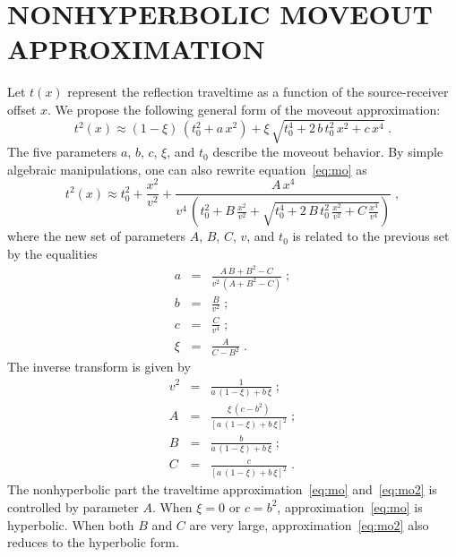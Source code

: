 \section{NONHYPERBOLIC MOVEOUT APPROXIMATION}

Let $t(x)$ represent the reflection traveltime as a function of the
source-receiver offset $x$. We propose the following general form of
the moveout approximation:
\begin{equation}
\label{eq:mo}
t^2(x) \approx (1-\xi)\,(t_0^2+a\,x^2) + \xi\,\sqrt{t_0^4 + 2\,b\,t_0^2\,x^2 + c\,x^4}\;.
\end{equation}
The five parameters $a$, $b$, $c$, $\xi$, and $t_0$
describe the moveout behavior. By simple algebraic manipulations, one
can also rewrite equation~\ref{eq:mo} as
\begin{equation}
\label{eq:mo2}
t^2(x) \approx t_0^2+\frac{x^2}{v^2} + \frac{A\,x^4}
{\displaystyle v^4\,\left(t_0^2+B\,\frac{x^2}{v^2} + \sqrt{t_0^4 + 2\,B\,t_0^2\,\frac{x^2}{v^2} + C\,\frac{x^4}{v^4}}\right)}\;,
\end{equation}
where the new set of parameters $A$, $B$, $C$, $v$, and $t_0$ is
related to the previous set by the equalities
\begin{eqnarray}
\label{eq;alpha}
a & = & \frac{A\,B+B^2-C}{v^2\,\left(A+B^2-C\right)}\;; \\
\label{eq:beta}
b & = & \frac{B}{v^2}\;; \\
\label{eq:gamma}
c & = & \frac{C}{v^4}\;; \\
\label{eq:xi}
\xi & = & \frac{A}{C-B^2}\;.
\end{eqnarray}
The inverse transform is given by
\begin{eqnarray}
\label{eq:v}
v^2 & = & \frac{1}{a\,(1-\xi) + b\,\xi}\;; \\
\label{eq:a}
A & = & \frac{\xi\,\left(c - b^2\right)}
{\left[a\,(1-\xi) + b\,\xi\right]^2}\;; \\
\label{eq:b}
B & = & \frac{b}{a\,(1-\xi) + b\,\xi}\;; \\
\label{eq:c}
C & = & \frac{c}{\left[a\,(1-\xi) + b\,\xi\right]^2}\;.
\end{eqnarray}
The  nonhyperbolic part   the traveltime approximation~\ref{eq:mo}
and~\ref{eq:mo2} is controlled by parameter  $A$.
 When  $\xi=0$ or $c=b^2$\new{)},
approximation~\ref{eq:mo} is hyperbolic. When both $B$ and $C$ are
very large, approximation~\ref{eq:mo2} also reduces to the hyperbolic
form.

